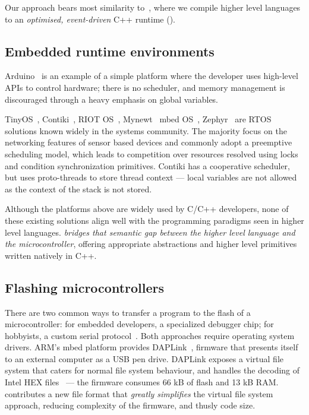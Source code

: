 Our approach bears most similarity to~\cite{varma2004java}, where we compile higher level languages to an \emph{optimised, event-driven} C++ runtime (\CON).

\subsection{Embedded runtime environments}


Arduino~\cite{buildingArduino2014} is an example of a simple platform where the developer uses high-level APIs to control hardware; there is no scheduler, and memory management is discouraged through a heavy emphasis on global variables.

TinyOS~\cite{levis2005tinyos}, Contiki~\cite{dunkels2012contiki}, RIOT OS~\cite{baccelli2013riot}, Mynewt~\cite{ApacheMy53:online} mbed OS~\cite{ARMmbed}, Zephyr~\cite{HomeZeph63:online} are RTOS solutions known widely in the systems community. The majority focus on the networking features of sensor based devices and commonly adopt a preemptive scheduling model, which leads to competition over resources resolved using locks and condition synchronization primitives. Contiki has a cooperative scheduler, but uses proto-threads to store thread context --- local variables are not allowed as the context of the stack is not stored.

Although the platforms above are widely used by C/C++ developers, none of these existing solutions align well with the programming paradigms seen in higher level languages. \CO \emph{bridges that semantic gap between the higher level language and the microcontroller}, offering appropriate abstractions and higher level primitives written natively in C++.

\subsection{Flashing microcontrollers}

There are two common ways to transfer a program to the flash of a microcontroller: for embedded developers, a specialized debugger chip; for hobbyists, a custom serial protocol~\cite{AVRDUDEA15:online}. Both approaches require operating system drivers. ARM's mbed platform provides DAPLink~\cite{GitHubAR5:online}, firmware that presents itself to an external computer as a USB pen drive. DAPLink exposes a virtual file system that caters for normal file system behaviour, and handles the decoding of Intel HEX files~\cite{IntelHEX} --- the firmware consumes 66 kB of flash and 13 kB RAM. \UF contributes a new file format that \emph{greatly simplifies} the virtual file system approach, reducing complexity of the firmware, and thusly code size.

